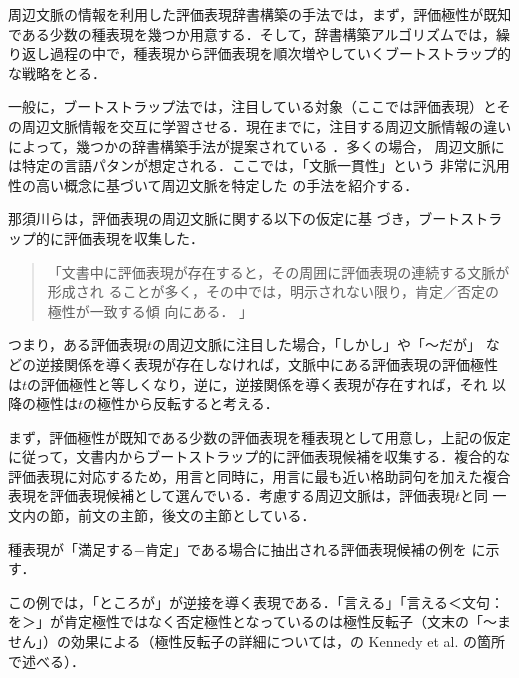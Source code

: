 周辺文脈の情報を利用した評価表現辞書構築の手法では，まず，評価極性が既知
である少数の種表現を幾つか用意する．そして，辞書構築アルゴリズムでは，繰
り返し過程の中で，種表現から評価表現を順次増やしていくブートストラップ的
な戦略をとる．

一般に，ブートストラップ法では，注目している対象（ここでは評価表現）とそ
の周辺文脈情報を交互に学習させる．現在までに，注目する周辺文脈情報の違い
によって，幾つかの辞書構築手法が提案されている
\cite{kobayashi2001a,inui2004a,nakayama2004a,kobayashi2005a}．多くの場合，
周辺文脈には特定の言語パタンが想定される．ここでは，「文脈一貫性」という
非常に汎用性の高い概念に基づいて周辺文脈を特定した\cite{nasukawa2004a} 
の手法を紹介する．

\vspace{1em}
\underline{\textbf{\cite{nasukawa2004a}}}
\vspace{1em}

那須川ら\cite{nasukawa2004a}は，評価表現の周辺文脈に関する以下の仮定に基
づき，ブートストラップ的に評価表現を収集した．
\begin{quote}
「文書中に評価表現が存在すると，その周囲に評価表現の連続する文脈が形成され
ることが多く，その中では，明示されない限り，肯定／否定の極性が一致する傾
向にある． 」
\end{quote}
つまり，ある評価表現$t$の周辺文脈に注目した場合，「しかし」や「〜だが」
などの逆接関係を導く表現が存在しなければ，文脈中にある評価表現の評価極性
は$t$の評価極性と等しくなり，逆に，逆接関係を導く表現が存在すれば，それ
以降の極性は$t$の極性から反転すると考える．

まず，評価極性が既知である少数の評価表現を種表現として用意し，上記の仮定
に従って，文書内からブートストラップ的に評価表現候補を収集する．複合的な
評価表現に対応するため，用言と同時に，用言に最も近い格助詞句を加えた複合
表現を評価表現候補として選んでいる．考慮する周辺文脈は，評価表現$t$と同
一文内の節，前文の主節，後文の主節としている．

種表現が「満足する−肯定」である場合に抽出される評価表現候補の例を
に示す．

この例では，「ところが」が逆接を導く表現である．「言える」「言える＜文句：
を＞」が肯定極性ではなく否定極性となっているのは極性反転子（文末の「〜ま
せん」）の効果による（極性反転子の詳細については，の
Kennedy et al. \cite{kennedy2005a}の箇所で述べる）．

